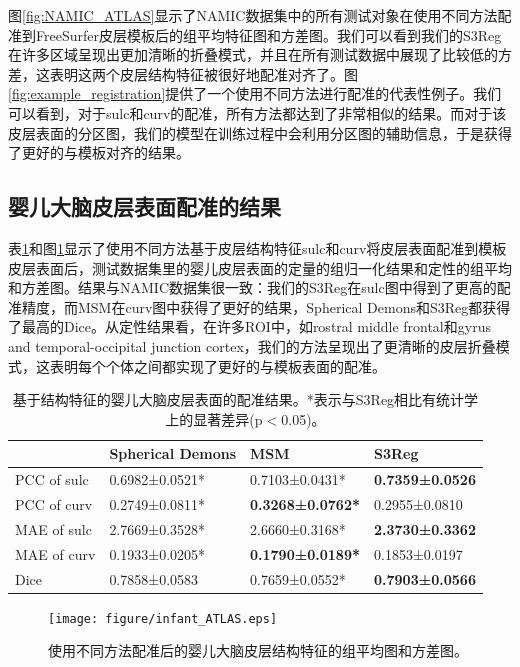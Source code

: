 图\ref{fig:NAMIC_ATLAS}显示了NAMIC数据集中的所有测试对象在使用不同方法配准到FreeSurfer皮层模板后的组平均特征图和方差图。我们可以看到我们的S3Reg在许多区域呈现出更加清晰的折叠模式，并且在所有测试数据中展现了比较低的方差，这表明这两个皮层结构特征被很好地配准对齐了。图\ref{fig:example_registration}提供了一个使用不同方法进行配准的代表性例子。我们可以看到，对于sulc和curv的配准，所有方法都达到了非常相似的结果。而对于该皮层表面的分区图，我们的模型在训练过程中会利用分区图的辅助信息，于是获得了更好的与模板对齐的结果。

\subsection{婴儿大脑皮层表面配准的结果}
表\ref{tab:婴儿皮层表面的配准结果}和图\ref{fig:infant_ATLAS}显示了使用不同方法基于皮层结构特征sulc和curv将皮层表面配准到模板皮层表面后，测试数据集里的婴儿皮层表面的定量的组归一化结果和定性的组平均和方差图。结果与NAMIC数据集很一致：我们的S3Reg在sulc图中得到了更高的配准精度，而MSM在curv图中获得了更好的结果，Spherical Demons和S3Reg都获得了最高的Dice。从定性结果看，在许多ROI中，如rostral middle frontal和gyrus and temporal-occipital junction cortex，我们的方法呈现出了更清晰的皮层折叠模式，这表明每个个体之间都实现了更好的与模板表面的配准。

\begin{table}[t]
	\caption{基于结构特征的婴儿大脑皮层表面的配准结果。*表示与S3Reg相比有统计学上的显著差异(p$<$0.05)。}
	\label{tab:婴儿皮层表面的配准结果}
	\centering
	\begin{tabularx}{0.9\columnwidth}{X<{\centering}|X<{\centering}|X<{\centering}|X<{\centering}}
		\hline
			& Spherical Demons &	MSM	& S3Reg  \\
		\hline
			PCC of sulc &	0.6982±0.0521* &	0.7103±0.0431*  &	\textbf{0.7359±0.0526}  \\
			PCC of curv &	0.2749±0.0811*	&  \textbf{0.3268±0.0762*}  &	0.2955±0.0810\\
			MAE of sulc &	2.7669±0.3528* &	2.6660±0.3168* &	\textbf{2.3730±0.3362}  \\
			MAE of curv &	0.1933±0.0205* &	\textbf{0.1790±0.0189*} &	0.1853±0.0197\\
			Dice&	0.7858±0.0583 &	0.7659±0.0552* &	\textbf{0.7903±0.0566} \\		
		\hline
	\end{tabularx}
\end{table}

\begin{figure}[h]
	\centering
	\texttt{[image: figure/infant\_ATLAS.eps]}
	\caption{使用不同方法配准后的婴儿大脑皮层结构特征的组平均图和方差图。}
	\label{fig:infant_ATLAS}
\end{figure}

